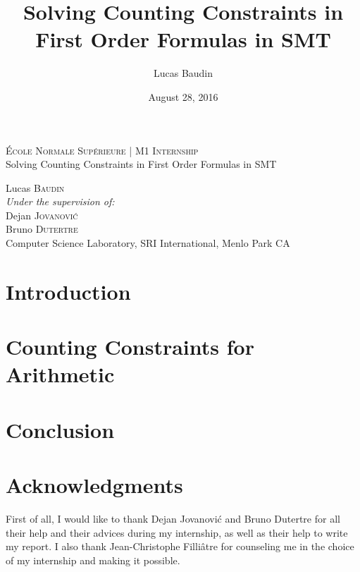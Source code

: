 \documentclass[]{article}
\title{Solving Counting Constraints in First Order Formulas in SMT}
\date{August 28, 2016}
\author{Lucas Baudin}
\begin{document}
\begin{titlepage}
  \begin{center}

    \textsc{École Normale Supérieure} | \textsc{M1 Internship}\\[7cm]
{\huge Solving Counting Constraints in First Order Formulas in SMT}


      \large
		\vspace{1.5cm}
        Lucas \textsc{Baudin}\\
		\vspace{4cm}
        \emph{Under the supervision of:}\\
		\vspace{0.3cm}
		Dejan \textsc{Jovanović}\\
		Bruno \textsc{Dutertre}\\
		\vspace{0.2cm}
		Computer Science Laboratory, SRI International, Menlo Park CA


  \end{center}
\end{titlepage}

{
\setcounter{tocdepth}{3}
\tableofcontents
}

\newtheorem{definition}{Definition} \newtheorem{lemma}{Lemma}
\newtheorem{theorem}{Theorem} \newtheorem{property}{Property}


\section*{Introduction}\label{introduction}
\label{sec:intro}


\section{Counting Constraints for Arithmetic}
\label{sec:arith}



\newpage
\section*{Conclusion}
\label{sec:conclusion}


\section*{Acknowledgments}

First of all, I would like to thank Dejan Jovanović and Bruno Dutertre for all their help and their advices during my internship, as well as their help to write my report.
I also thank Jean-Christophe Filliâtre for counseling me in the choice of my internship and making it possible.


\end{document}
